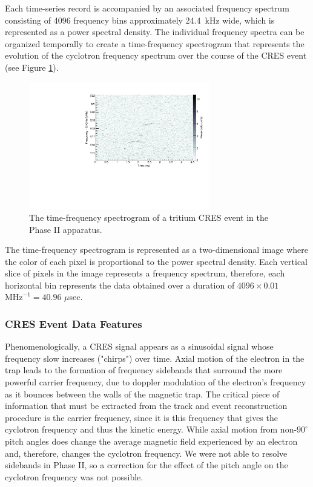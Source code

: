 Each time-series record is accompanied by an associated frequency spectrum consisting of 4096 frequency bins approximately 24.4~kHz wide, which is represented as a power spectral density. The individual frequency spectra can be organized temporally to create a time-frequency spectrogram that represents the evolution of the cyclotron frequency spectrum over the course of the CRES event (see Figure \ref{fig:chap3-tritium-event0-spectrogram}). 
\begin{figure}[htbp]
    \centering
    \includegraphics[width=0.7\textwidth]{figs/Chapter-3/T2_Event0.pdf}
    \caption{The time-frequency spectrogram of a tritium CRES event in the Phase II apparatus.}
    \label{fig:chap3-tritium-event0-spectrogram}
\end{figure}
The time-frequency spectrogram is represented as a two-dimensional image where the color of each pixel is proportional to the power spectral density. Each vertical slice of pixels in the image represents a frequency spectrum, therefore, each horizontal bin represents the data obtained over a duration of $4096\times 0.01$ $\mathrm{MHz}^{-1}=40.96$ $\mu$sec. 

\subsubsection*{CRES Event Data Features}

Phenomenologically, a CRES signal appears as a sinusoidal signal whose frequency slow increases ("chirps") over time. Axial motion of the electron in the trap leads to the formation of frequency sidebands that surround the more powerful carrier frequency, due to doppler modulation of the electron's frequency as it bounces between the walls of the magnetic trap. The critical piece of information that must be extracted from the track and event reconstruction procedure is the carrier frequency, since it is this frequency that gives the cyclotron frequency and thus the kinetic energy. While axial motion from non-$90^\circ$ pitch angles does change the average magnetic field experienced by an electron and, therefore, changes the cyclotron frequency. We were not able to resolve sidebands in Phase II, so a correction for the effect of the pitch angle on the cyclotron frequency was not possible. 

